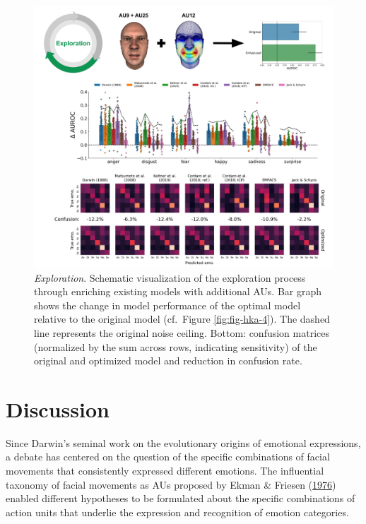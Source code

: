 \documentclass[12pt,american,a4paper,oneside,]{memoir} %
\begin{document}
\begin{figure}
\centering
\includegraphics{_bookdown_files/hypothesis-kernel-analysis-files/figures/figure_6.pdf}
\caption{\label{fig:fig-hka-6}\emph{Exploration}. Schematic visualization of the exploration process through enriching existing models with additional AUs. Bar graph shows the change in model performance of the optimal model relative to the original model (cf.~Figure \ref{fig:fig-hka-4}). The dashed line represents the original noise ceiling. Bottom: confusion matrices (normalized by the sum across rows, indicating sensitivity) of the original and optimized model and reduction in confusion rate.}
\end{figure}



\hypertarget{hka-discussion}{%
\section{Discussion}\label{hka-discussion}}

Since Darwin's seminal work on the evolutionary origins of emotional expressions, a debate has centered on the question of the specific combinations of facial movements that consistently expressed different emotions. The influential taxonomy of facial movements as AUs proposed by Ekman \& Friesen (\protect\hyperlink{ref-Ekman1976-hm}{1976}) enabled different hypotheses to be formulated about the specific combinations of action units that underlie the expression and recognition of emotion categories.
\end{document}
